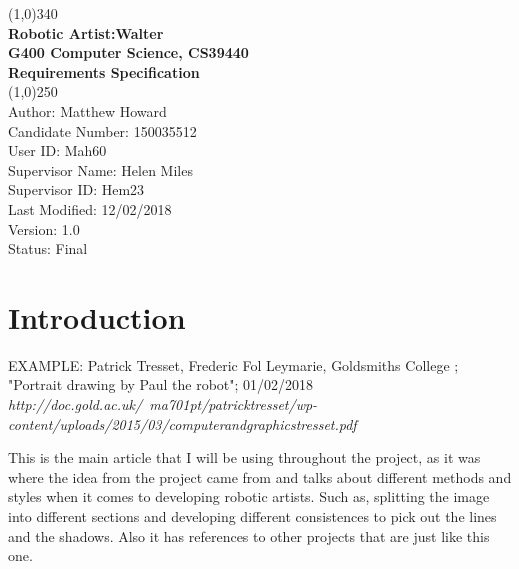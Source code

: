 \documentclass{article}
\begin{document}

    \begin{titlepage}

        \begin{center}

        \line(1,0){340}\\ 


        \large{\bfseries Robotic Artist:Walter} \\

        \large {\bfseries G400 Computer Science, CS39440 }\\
        
        \large {\bfseries Requirements Specification}\\


         \line(1,0){250}\\

         \textsf {Author: Matthew Howard \\
          Candidate Number: 150035512\\
          User ID: Mah60 \\
          Supervisor Name: Helen Miles \\
          Supervisor ID: Hem23\\
          Last Modified: 12/02/2018 \\
          Version: 1.0\\
          Status: Final} \\

        \end{center}        

    \end{titlepage}
  
    \clearpage

 	\tableofcontents
 	
 	\clearpage

    \section{Introduction}


    \begin{thebibliography}{9}


    EXAMPLE: Patrick Tresset, Frederic Fol Leymarie, Goldsmiths College ; "Portrait drawing by Paul the robot"; 01/02/2018 \\ 

    \textit{http://doc.gold.ac.uk/~ma701pt/patricktresset/wp-content/uploads/2015/03/computerandgraphicstresset.pdf}

    

This is the main article that I will be using throughout the project, as it was where the idea from the project came from and talks about different methods and styles when it comes to developing robotic artists. Such as, splitting the image into different sections and developing different consistences to pick out the lines and the shadows. Also it has references to other projects that are just like this one. 
    

    \end{thebibliography}
\end{document}
